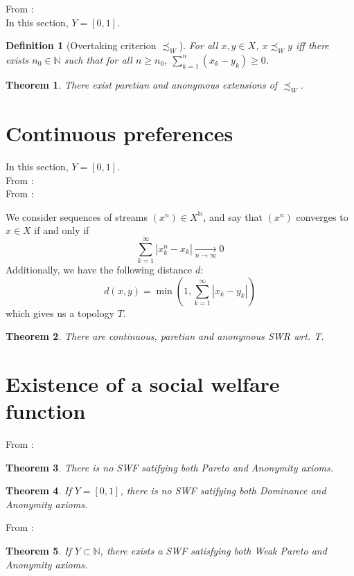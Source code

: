 \documentclass{article}
\newtheorem{definition}{Definition}
\newtheorem{theorem}{Theorem}
\begin{document}
From \cite{svensson80}:\bigskip\\
In this section, $Y=[0,1]$.

\begin{definition}[Overtaking criterion $\precsim_W$]
    For all $x,y\in X$, $x \precsim_W y$ iff there exists
    $n_0\in\mathbb{N}$ such that for all $n\geq n_0$,
    $\sum_{k=1}^n (x_k - y_k)\geq 0$.
\end{definition}

\begin{theorem}
    There exist paretian and anonymous extensions of $\precsim_W$.
\end{theorem}


\section{Continuous preferences}
In this section, $Y=[0,1]$.
\smallskip\\
From \cite{diamond65}:
\bigskip\\
From \cite{svensson80}:\smallskip\par
We consider sequences of streams $(x^n)\in X^\mathbb{N}$, and say that
$(x^n)$ converges to $x\in X$ if and only if
\[\sum_{k=1}^\infty |x^n_k - x_k| \underset{n\rightarrow\infty}{\rightarrow}0\]
Additionally, we have the following distance $d$:
\[d(x,y)=\min\left(1,\sum_{k=1}^\infty |x_k - y_k|\right)\]
which gives us a topology $T$.

\begin{theorem}
    There are continuous, paretian and anonymous SWR wrt. T.
\end{theorem}

\section{Existence of a social welfare function}

From \cite{basumitra03}:

\begin{theorem}
  There is no SWF satifying both Pareto and Anonymity axioms.
\end{theorem}

\begin{theorem}
  If $Y=[0,1]$, there is no SWF satifying both Dominance and Anonymity axioms.
\end{theorem}

From \cite{basumitra07p}:

\begin{theorem}
  If $Y\subset\mathbb N$, there exists a SWF satisfying both Weak Pareto and Anonymity axioms.
\end{theorem}



\end{document}
